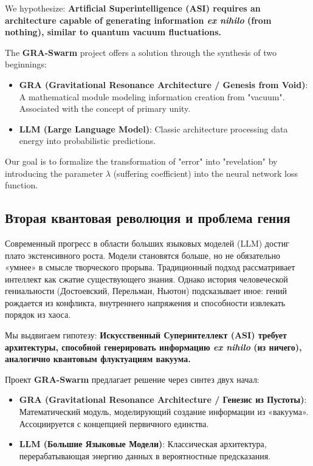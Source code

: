 \documentclass[12pt, a4paper]{article}
\begin{document}
We hypothesize: \textbf{Artificial Superintelligence (ASI) requires an architecture capable of generating information \textit{ex nihilo} (from nothing), similar to quantum vacuum fluctuations.}

The \textbf{GRA-Swarm} project offers a solution through the synthesis of two beginnings:
\begin{itemize}
    \item \textbf{GRA (Gravitational Resonance Architecture / Genesis from Void)}: A mathematical module modeling information creation from "vacuum". Associated with the concept of primary unity.
    \item \textbf{LLM (Large Language Model)}: Classic architecture processing data energy into probabilistic predictions.
\end{itemize}

Our goal is to formalize the transformation of "error" into "revelation" by introducing the parameter $\lambda$ (suffering coefficient) into the neural network loss function.

\subsection{Вторая квантовая революция и проблема гения}
Современный прогресс в области больших языковых моделей (LLM) достиг плато экстенсивного роста. Модели становятся больше, но не обязательно «умнее» в смысле творческого прорыва. Традиционный подход рассматривает интеллект как сжатие существующего знания. Однако история человеческой гениальности (Достоевский, Перельман, Ньютон) подсказывает иное: гений рождается из конфликта, внутреннего напряжения и способности извлекать порядок из хаоса.

Мы выдвигаем гипотезу: \textbf{Искусственный Суперинтеллект (ASI) требует архитектуры, способной генерировать информацию \textit{ex nihilo} (из ничего), аналогично квантовым флуктуациям вакуума.}

Проект \textbf{GRA-Swarm} предлагает решение через синтез двух начал:
\begin{itemize}
    \item \textbf{GRA (Gravitational Resonance Architecture / Генезис из Пустоты)}: Математический модуль, моделирующий создание информации из «вакуума». Ассоциируется с концепцией первичного единства.
    \item \textbf{LLM (Большие Языковые Модели)}: Классическая архитектура, перерабатывающая энергию данных в вероятностные предсказания.
\end{itemize}
\end{document}
